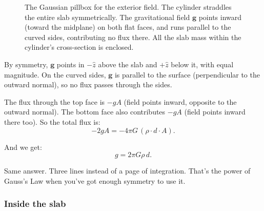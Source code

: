 \documentclass[11pt, letterpaper]{article}
\begin{document}
\begin{figure}[ht]
\caption{The Gaussian pillbox for the exterior field. The cylinder straddles the entire slab symmetrically. The gravitational field $\mathbf{g}$ points inward (toward the midplane) on both flat faces, and runs parallel to the curved sides, contributing no flux there. All the slab mass within the cylinder's cross-section is enclosed.}
\label{fig:pillbox}
\end{figure}

By symmetry, $\mathbf{g}$ points in $-\hat{z}$ above the slab and $+\hat{z}$ below it, with equal magnitude. On the curved sides, $\mathbf{g}$ is parallel to the surface (perpendicular to the outward normal), so no flux passes through the sides.

The flux through the top face is $-gA$ (field points inward, opposite to the outward normal). The bottom face also contributes $-gA$ (field points inward there too). So the total flux is:
\begin{equation}
  -2gA = -4\pi G\,(\rho \cdot d \cdot A).
\end{equation}

And we get:
\begin{equation}
  g = 2\pi G \rho\, d.
\end{equation}

Same answer. Three lines instead of a page of integration. That's the power of Gauss's Law when you've got enough symmetry to use it.

\subsubsection{Inside the slab}
\end{document}
